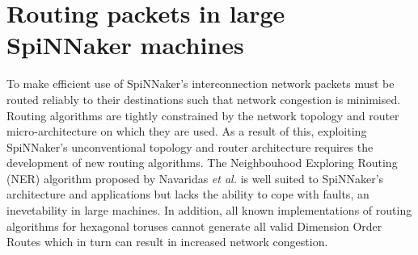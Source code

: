 \chapter{Routing packets in large SpiNNaker machines}
	
	
	
	
	
	
	
	
	
	To make efficient use of SpiNNaker's interconnection network packets must be
	routed reliably to their destinations such that network congestion is
	minimised. Routing algorithms are tightly constrained by the network topology
	and router micro-architecture on which they are used. As a result of this,
	exploiting SpiNNaker's unconventional topology and router architecture
	requires the development of new routing algorithms. The Neighbouhood
	Exploring Routing (NER) algorithm proposed by Navaridas \emph{et al.}
	\cite{navaridas14} is well suited to SpiNNaker's architecture and
	applications but lacks the ability to cope with faults, an inevetability in
	large machines. In addition, all known implementations of routing algorithms
	for hexagonal toruses cannot generate all valid Dimension Order Routes which
	in turn can result in increased network congestion.
	

